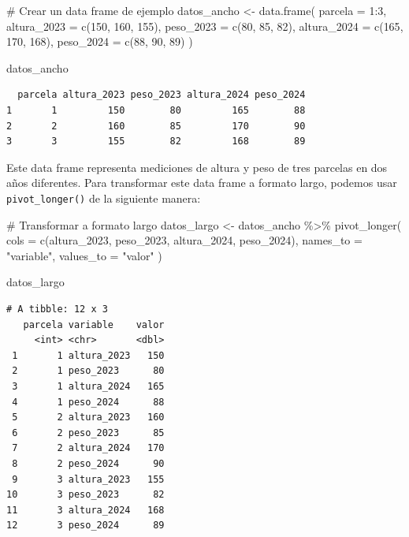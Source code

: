 \documentclass[
  spanish,
  a4paper,
  DIV=11,
  numbers=noendperiod,
  onepage,
  openany]{scrreprt}
\newenvironment{Shaded}{\begin{snugshade}}{\end{snugshade}}
\newcommand{\AttributeTok}[1]{\textcolor[rgb]{0.40,0.45,0.13}{#1}}
\newcommand{\CommentTok}[1]{\textcolor[rgb]{0.37,0.37,0.37}{#1}}
\newcommand{\DecValTok}[1]{\textcolor[rgb]{0.68,0.00,0.00}{#1}}
\newcommand{\FunctionTok}[1]{\textcolor[rgb]{0.28,0.35,0.67}{#1}}
\newcommand{\NormalTok}[1]{\textcolor[rgb]{0.00,0.23,0.31}{#1}}
\newcommand{\OtherTok}[1]{\textcolor[rgb]{0.00,0.23,0.31}{#1}}
\newcommand{\SpecialCharTok}[1]{\textcolor[rgb]{0.37,0.37,0.37}{#1}}
\newcommand{\StringTok}[1]{\textcolor[rgb]{0.13,0.47,0.30}{#1}}
\begin{document}
\begin{Shaded}
\begin{Highlighting}[]
\CommentTok{\# Crear un data frame de ejemplo}
\NormalTok{datos\_ancho }\OtherTok{\textless{}{-}} \FunctionTok{data.frame}\NormalTok{(}
  \AttributeTok{parcela =} \DecValTok{1}\SpecialCharTok{:}\DecValTok{3}\NormalTok{,}
  \AttributeTok{altura\_2023 =} \FunctionTok{c}\NormalTok{(}\DecValTok{150}\NormalTok{, }\DecValTok{160}\NormalTok{, }\DecValTok{155}\NormalTok{),}
  \AttributeTok{peso\_2023 =} \FunctionTok{c}\NormalTok{(}\DecValTok{80}\NormalTok{, }\DecValTok{85}\NormalTok{, }\DecValTok{82}\NormalTok{),}
  \AttributeTok{altura\_2024 =} \FunctionTok{c}\NormalTok{(}\DecValTok{165}\NormalTok{, }\DecValTok{170}\NormalTok{, }\DecValTok{168}\NormalTok{),}
  \AttributeTok{peso\_2024 =} \FunctionTok{c}\NormalTok{(}\DecValTok{88}\NormalTok{, }\DecValTok{90}\NormalTok{, }\DecValTok{89}\NormalTok{)}
\NormalTok{)}

\NormalTok{datos\_ancho}
\end{Highlighting}
\end{Shaded}

\begin{verbatim}
  parcela altura_2023 peso_2023 altura_2024 peso_2024
1       1         150        80         165        88
2       2         160        85         170        90
3       3         155        82         168        89
\end{verbatim}

Este data frame representa mediciones de altura y peso de tres parcelas
en dos años diferentes. Para transformar este data frame a formato
largo, podemos usar \texttt{pivot\_longer()} de la siguiente manera:

\begin{Shaded}
\begin{Highlighting}[]
\CommentTok{\# Transformar a formato largo}
\NormalTok{datos\_largo }\OtherTok{\textless{}{-}}\NormalTok{ datos\_ancho }\SpecialCharTok{\%\textgreater{}\%}
  \FunctionTok{pivot\_longer}\NormalTok{(}
    \AttributeTok{cols =} \FunctionTok{c}\NormalTok{(altura\_2023, peso\_2023, altura\_2024, peso\_2024),}
    \AttributeTok{names\_to =} \StringTok{"variable"}\NormalTok{,}
    \AttributeTok{values\_to =} \StringTok{"valor"}
\NormalTok{  )}

\NormalTok{datos\_largo}
\end{Highlighting}
\end{Shaded}

\begin{verbatim}
# A tibble: 12 x 3
   parcela variable    valor
     <int> <chr>       <dbl>
 1       1 altura_2023   150
 2       1 peso_2023      80
 3       1 altura_2024   165
 4       1 peso_2024      88
 5       2 altura_2023   160
 6       2 peso_2023      85
 7       2 altura_2024   170
 8       2 peso_2024      90
 9       3 altura_2023   155
10       3 peso_2023      82
11       3 altura_2024   168
12       3 peso_2024      89
\end{verbatim}
\end{document}
